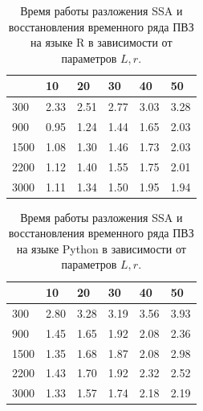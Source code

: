 \documentclass[specialist,
			   substylefile = spbu_report.rtx,
			   subf,href,colorlinks=true, 12pt]{disser}
\begin{document}
\begin{table}[htp]
	\centering
	\begin{tabular}{ | l | l | l | l | l | l |}
		
		\hline
		\backslashbox{$L$}{$r$} & 10 & 20 & 30 & 40 & 50 \\ 
		\hline
		300 & 2.33 & 2.51 & 2.77 & 3.03 & 3.28  \\
		\hline
		900 & 0.95 & 1.24 & 1.44 & 1.65 & 2.03 \\
		\hline
		1500 & 1.08 & 1.30 & 1.46 & 1.73 & 2.03 \\
		\hline
		2200 & 1.12 & 1.40 & 1.55 & 1.75 & 2.01 \\
		\hline
		3000 & 1.11 & 1.34 & 1.50 & 1.95 & 1.94 \\
		\hline
	\end{tabular}
	\caption{\label{tab:r-time-table} Время работы разложения SSA и восстановления временного ряда ПВЗ на языке R в зависимости от параметров $L, r$.}
\end{table}

\begin{table}[htp]
	\centering
	\begin{tabular}{ | l | l | l | l | l | l |}
		
		\hline
		\backslashbox{$L$}{$r$} & 10 & 20 & 30 & 40 & 50 \\ 
		\hline
		300 & 2.80 & 3.28 & 3.19 & 3.56 & 3.93  \\
		\hline
		900 & 1.45 & 1.65 & 1.92 & 2.08 & 2.36 \\
		\hline
		1500 & 1.35 & 1.68 & 1.87 & 2.08 & 2.98 \\
		\hline
		2200 & 1.43 & 1.70 & 1.92 & 2.32 & 2.52 \\
		\hline
		3000 & 1.33 & 1.57 & 1.74 & 2.18 & 2.19 \\
		\hline
	\end{tabular}
	\caption{\label{tab:py-time-table} Время работы разложения SSA и восстановления временного ряда ПВЗ на языке Python в зависимости от параметров $L, r$.}
\end{table}
\end{document}
